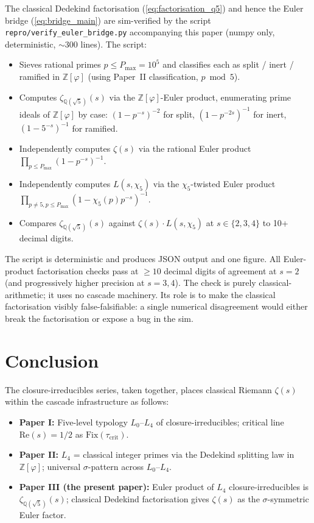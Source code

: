 \documentclass[11pt,a4paper]{article}
\theoremstyle{definition}
\theoremstyle{remark}
\begin{document}
The classical Dedekind factorisation (\ref{eq:factorisation_q5}) and
hence the Euler bridge (\ref{eq:bridge_main}) are sim-verified by the
script \texttt{repro/verify\_euler\_bridge.py} accompanying this paper
(numpy only, deterministic, $\sim$300 lines). The script:
\begin{itemize}
\item Sieves rational primes $p \le P_{\max} = 10^5$ and classifies
      each as split / inert / ramified in $\mathbb{Z}[\varphi]$ (using
      Paper~II classification, $p \bmod 5$).
\item Computes $\zeta_{\mathbb{Q}(\sqrt{5})}(s)$ via the
      $\mathbb{Z}[\varphi]$-Euler product, enumerating prime ideals of
      $\mathbb{Z}[\varphi]$ by case:
      $(1 - p^{-s})^{-2}$ for split, $(1 - p^{-2s})^{-1}$ for inert,
      $(1 - 5^{-s})^{-1}$ for ramified.
\item Independently computes $\zeta(s)$ via the rational Euler product
      $\prod_{p \le P_{\max}} (1 - p^{-s})^{-1}$.
\item Independently computes $L(s, \chi_5)$ via the $\chi_5$-twisted
      Euler product
      $\prod_{p \neq 5, p \le P_{\max}} (1 - \chi_5(p) p^{-s})^{-1}$.
\item Compares $\zeta_{\mathbb{Q}(\sqrt{5})}(s)$ against
      $\zeta(s) \cdot L(s, \chi_5)$ at $s \in \{2, 3, 4\}$ to 10+
      decimal digits.
\end{itemize}

The script is deterministic and produces JSON output and one figure.
All Euler-product factorisation checks pass at $\ge 10$ decimal digits
of agreement at $s = 2$ (and progressively higher precision at
$s = 3, 4$). The check is purely classical-arithmetic; it uses no
cascade machinery. Its role is to make the classical factorisation
visibly false-falsifiable: a single numerical disagreement would either
break the factorisation or expose a bug in the sim.

\section{Conclusion}\label{sec:conclusion}

The closure-irreducibles series, taken together, places classical
Riemann $\zeta(s)$ within the cascade infrastructure as follows:

\begin{itemize}
\item \textbf{Paper I:} Five-level typology $L_0$--$L_4$ of
      closure-irreducibles; critical line $\mathrm{Re}(s) = 1/2$ as
      $\mathrm{Fix}(\tau_{\mathrm{crit}})$.
\item \textbf{Paper II:} $L_4$ = classical integer primes via the
      Dedekind splitting law in $\mathbb{Z}[\varphi]$; universal
      $\sigma$-pattern across $L_0$--$L_4$.
\item \textbf{Paper III (the present paper):} Euler product of $L_4$
      closure-irreducibles is $\zeta_{\mathbb{Q}(\sqrt{5})}(s)$;
      classical Dedekind factorisation gives $\zeta(s)$ as the
      $\sigma$-symmetric Euler factor.
\end{itemize}
\end{document}
